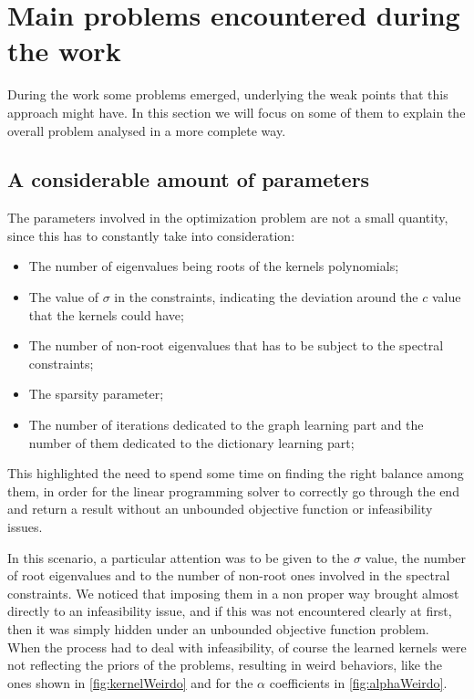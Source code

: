 \chapter{Main problems encountered during the work}
During the work some problems emerged, underlying the weak points that this approach might have. In this section we will focus on some of them to explain the overall problem analysed in a more complete way.

\section{A considerable amount of parameters}
The parameters involved in the optimization problem are not a small quantity, since this has to constantly take into consideration:
\begin{itemize}
  \item The number of eigenvalues being roots of the kernels polynomials;
  \item The value of $\sigma$ in the constraints, indicating the deviation around the $c$ value that the kernels could have;
  \item The number of non-root eigenvalues that has to be subject to the spectral constraints;
  \item The sparsity parameter;
  \item The number of iterations dedicated to the graph learning part and the number of them dedicated to the dictionary learning part;
\end{itemize}
This highlighted the need to spend some time on finding the right balance among them, in order for the linear programming solver to correctly go through the end and return a result without an unbounded objective function or infeasibility issues.

In this scenario, a particular attention was to be given to the $\sigma$ value, the number of root eigenvalues and to the number of non-root ones involved in the spectral constraints. We noticed that imposing them in a non proper way brought almost directly to an infeasibility issue, and if this was not encountered clearly at first, then it was simply hidden under an unbounded objective function problem.\\
When the process had to deal with infeasibility, of course the learned kernels were not reflecting the priors of the problems, resulting in weird behaviors, like the ones shown in \autoref{fig:kernelWeirdo} and for the $\alpha$ coefficients in \autoref{fig:alphaWeirdo}.

